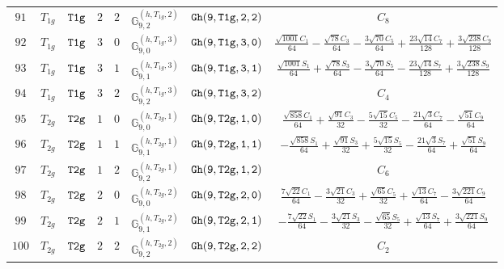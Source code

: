 \documentclass[fleqn,8pt]{jsarticle}
\begin{document}
\begin{table}[ht!]
\begin{center}
\begin{tabular}{cccccccc}
$ 91 $ & $ T_{1g} $ & $ {\tt T1g} $ & $ 2 $ & $ 2 $ & $ \mathbb{G}_{9,2}^{(h,T_{1g},2)} $ & $ {\tt Gh(9,T1g,2,2)} $ & $ C_{8} $ \\
$ 92 $ & $ T_{1g} $ & $ {\tt T1g} $ & $ 3 $ & $ 0 $ & $ \mathbb{G}_{9,0}^{(h,T_{1g},3)} $ & $ {\tt Gh(9,T1g,3,0)} $ & $ \frac{\sqrt{1001} C_{1}}{64} - \frac{\sqrt{78} C_{3}}{64} - \frac{3 \sqrt{70} C_{5}}{64} + \frac{23 \sqrt{14} C_{7}}{128} + \frac{3 \sqrt{238} C_{9}}{128} $ \\
$ 93 $ & $ T_{1g} $ & $ {\tt T1g} $ & $ 3 $ & $ 1 $ & $ \mathbb{G}_{9,1}^{(h,T_{1g},3)} $ & $ {\tt Gh(9,T1g,3,1)} $ & $ \frac{\sqrt{1001} S_{1}}{64} + \frac{\sqrt{78} S_{3}}{64} - \frac{3 \sqrt{70} S_{5}}{64} - \frac{23 \sqrt{14} S_{7}}{128} + \frac{3 \sqrt{238} S_{9}}{128} $ \\
$ 94 $ & $ T_{1g} $ & $ {\tt T1g} $ & $ 3 $ & $ 2 $ & $ \mathbb{G}_{9,2}^{(h,T_{1g},3)} $ & $ {\tt Gh(9,T1g,3,2)} $ & $ C_{4} $ \\
$ 95 $ & $ T_{2g} $ & $ {\tt T2g} $ & $ 1 $ & $ 0 $ & $ \mathbb{G}_{9,0}^{(h,T_{2g},1)} $ & $ {\tt Gh(9,T2g,1,0)} $ & $ \frac{\sqrt{858} C_{1}}{64} + \frac{\sqrt{91} C_{3}}{32} - \frac{5 \sqrt{15} C_{5}}{32} - \frac{21 \sqrt{3} C_{7}}{64} - \frac{\sqrt{51} C_{9}}{64} $ \\
$ 96 $ & $ T_{2g} $ & $ {\tt T2g} $ & $ 1 $ & $ 1 $ & $ \mathbb{G}_{9,1}^{(h,T_{2g},1)} $ & $ {\tt Gh(9,T2g,1,1)} $ & $ - \frac{\sqrt{858} S_{1}}{64} + \frac{\sqrt{91} S_{3}}{32} + \frac{5 \sqrt{15} S_{5}}{32} - \frac{21 \sqrt{3} S_{7}}{64} + \frac{\sqrt{51} S_{9}}{64} $ \\
$ 97 $ & $ T_{2g} $ & $ {\tt T2g} $ & $ 1 $ & $ 2 $ & $ \mathbb{G}_{9,2}^{(h,T_{2g},1)} $ & $ {\tt Gh(9,T2g,1,2)} $ & $ C_{6} $ \\
$ 98 $ & $ T_{2g} $ & $ {\tt T2g} $ & $ 2 $ & $ 0 $ & $ \mathbb{G}_{9,0}^{(h,T_{2g},2)} $ & $ {\tt Gh(9,T2g,2,0)} $ & $ \frac{7 \sqrt{22} C_{1}}{64} - \frac{3 \sqrt{21} C_{3}}{32} + \frac{\sqrt{65} C_{5}}{32} + \frac{\sqrt{13} C_{7}}{64} - \frac{3 \sqrt{221} C_{9}}{64} $ \\
$ 99 $ & $ T_{2g} $ & $ {\tt T2g} $ & $ 2 $ & $ 1 $ & $ \mathbb{G}_{9,1}^{(h,T_{2g},2)} $ & $ {\tt Gh(9,T2g,2,1)} $ & $ - \frac{7 \sqrt{22} S_{1}}{64} - \frac{3 \sqrt{21} S_{3}}{32} - \frac{\sqrt{65} S_{5}}{32} + \frac{\sqrt{13} S_{7}}{64} + \frac{3 \sqrt{221} S_{9}}{64} $ \\
$ 100 $ & $ T_{2g} $ & $ {\tt T2g} $ & $ 2 $ & $ 2 $ & $ \mathbb{G}_{9,2}^{(h,T_{2g},2)} $ & $ {\tt Gh(9,T2g,2,2)} $ & $ C_{2} $ \\
 \hline \hline
\end{tabular}
\end{center}
\end{table}
\end{document}
